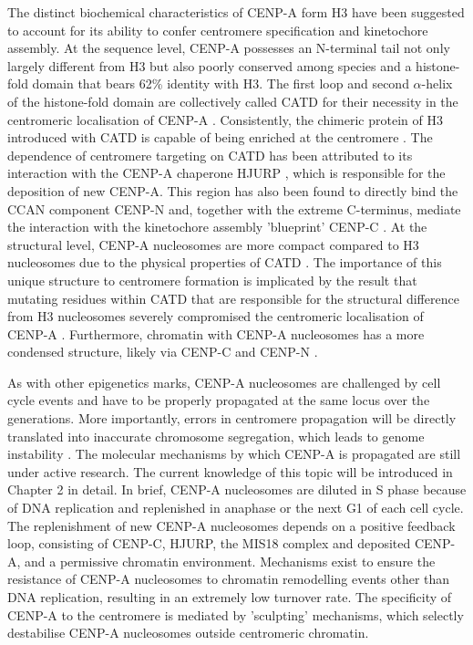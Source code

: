 The distinct biochemical characteristics of CENP-A form H3 have been suggested to account for its ability to confer centromere specification and kinetochore assembly. At the sequence level, CENP-A possesses an N-terminal tail not only largely different from H3 \citep{Sullivan1994HumanCentromere.} but also poorly conserved among species \citep{Goutte-Gattat2013PhosphorylationFunction} and a histone-fold domain that bears 62\% identity with H3. The first loop and second $\alpha$-helix of the histone-fold domain are collectively called CATD for their necessity in the centromeric localisation of CENP-A \citep{Black2007}. Consistently, the chimeric protein of H3 introduced with CATD is capable of being enriched at the centromere \citep{Black2007a}. The dependence of centromere targeting on CATD has been attributed to its interaction with the CENP-A chaperone HJURP \citep{Zhou2011StructuralScm3, Bassett2012, Hu2011StructureHJURP, Shuaib2010HJURPCentromeres}, which is responsible for the deposition of new CENP-A. This region has also been found to directly bind the CCAN component CENP-N \citep{Logsdon2015, Carroll2010, Carroll2009} and, together with the extreme C-terminus, mediate the interaction with the kinetochore assembly 'blueprint' CENP-C \citep{Carroll2010, Kato2013Spt6H3, Guse2011, Walstein2021}. At the structural level, CENP-A nucleosomes are more compact compared to H3 nucleosomes due to the physical properties of CATD \citep{Black2004, Sekulic2010}. The importance of this unique structure to centromere formation is implicated by the result that mutating residues within CATD that are responsible for the structural difference from H3 nucleosomes severely compromised the centromeric localisation of CENP-A \citep{Sekulic2010}. Furthermore, chromatin with CENP-A nucleosomes has a more condensed structure, likely via CENP-C and CENP-N \citep{Panchenko2011, Geiss2014, Zhou2022}. 

As with other epigenetics marks, CENP-A nucleosomes are challenged by cell cycle events and have to be properly propagated at the same locus over the generations. More importantly, errors in centromere propagation will be directly translated into inaccurate chromosome segregation, which leads to genome instability \citep{McClintock1939TheMeiosis, Koshland1987ACerevisiae}. The molecular mechanisms by which CENP-A is propagated are still under active research. The current knowledge of this topic will be introduced in Chapter 2 in detail. In brief, CENP-A nucleosomes are diluted in S phase because of DNA replication and replenished in anaphase or the next G1 of each cell cycle. The replenishment of new CENP-A nucleosomes depends on a positive feedback loop, consisting of CENP-C, HJURP, the MIS18 complex and deposited CENP-A, and a permissive chromatin environment. Mechanisms exist to ensure the resistance of CENP-A nucleosomes to chromatin remodelling events other than DNA replication, resulting in an extremely low turnover rate. The specificity of CENP-A to the centromere is mediated by 'sculpting' mechanisms, which selectly destabilise CENP-A nucleosomes outside centromeric chromatin. 

